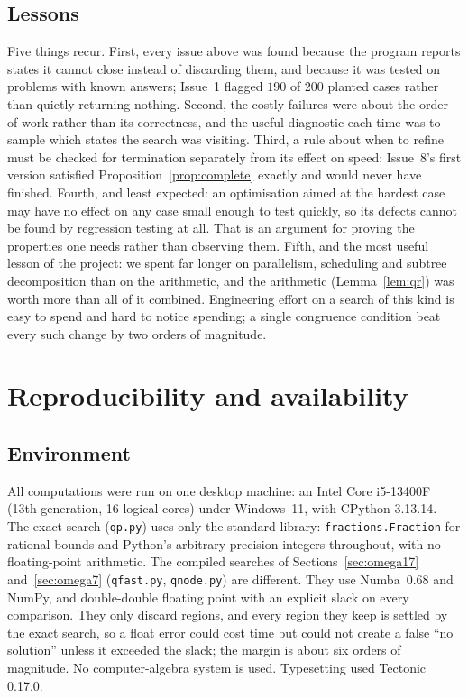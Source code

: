 \documentclass[11pt]{amsart}
\theoremstyle{remark}
\begin{document}
\subsection{Lessons}
Five things recur. First, every issue above was found because the program reports
states it cannot close instead of discarding them, and because it was tested on
problems with known answers; Issue~1 flagged $190$ of $200$ planted cases rather
than quietly returning nothing. Second, the costly failures were about the order
of work rather than its correctness, and the useful diagnostic each time was to
sample which states the search was visiting. Third, a rule about when to refine
must be checked for termination separately from its effect on speed: Issue~8's
first version satisfied Proposition~\ref{prop:complete} exactly and would never
have finished. Fourth, and least expected: an optimisation aimed at the hardest
case may have no effect on any case small enough to test quickly, so its defects
cannot be found by regression testing at all. That is an argument for proving the
properties one needs rather than observing them. Fifth, and the most useful
lesson of the project: we spent far longer on parallelism, scheduling and
subtree decomposition than on the arithmetic, and the arithmetic
(Lemma~\ref{lem:qr}) was worth more than all of it combined. Engineering effort
on a search of this kind is easy to spend and hard to notice spending; a single
congruence condition beat every such change by two orders of magnitude.

\section{Reproducibility and availability}\label{sec:repro}

\subsection{Environment}
All computations were run on one desktop machine: an Intel Core i5-13400F
(13th generation, 16 logical cores) under Windows~11, with CPython 3.13.14.
The exact search (\texttt{qp.py}) uses only the standard library:
\texttt{fractions.Fraction} for rational bounds and Python's arbitrary-precision
integers throughout, with no floating-point arithmetic. The compiled searches of
Sections~\ref{sec:omega17} and~\ref{sec:omega7} (\texttt{qfast.py},
\texttt{qnode.py}) are different. They use Numba~0.68 and NumPy, and double-double
floating point with an explicit slack on every comparison. They only discard
regions, and every region they keep is settled by the exact search, so a float
error could cost time but could not create a false ``no solution'' unless it
exceeded the slack; the margin is about six orders of magnitude. No
computer-algebra system is used. Typesetting used Tectonic 0.17.0.
\end{document}
